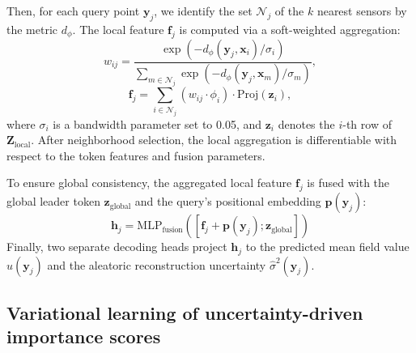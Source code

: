 \documentclass[pdflatex,sn-nature]{sn-jnl}%
\begin{document}
Then, for each query point $\mathbf{y}_j$, we identify the set $\mathcal{N}_j$ of the $k$ nearest sensors by the metric $d_{\phi}$. The local feature $\mathbf{f}_j$ is computed via a soft-weighted aggregation:
\begin{equation}
    w_{ij} = \frac{\exp(-d_{\phi}(\mathbf{y}_j, \mathbf{x}_i) / \sigma_i)}{\sum_{m \in \mathcal{N}_j} \exp(-d_{\phi}(\mathbf{y}_j, \mathbf{x}_m) / \sigma_m)},
\end{equation}
\begin{equation}
    \mathbf{f}_j = \sum_{i \in \mathcal{N}_j} (w_{ij} \cdot \phi_i) \cdot \text{Proj}(\mathbf{z}_i),
\end{equation}
where $\sigma_i$ is a bandwidth parameter set to 0.05, and $\mathbf{z}_i$ denotes the $i$-th row of $\mathbf{Z}_{\text{local}}$. 
After neighborhood selection, the local aggregation is differentiable with respect to the token features and fusion parameters.

To ensure global consistency, the aggregated local feature $\mathbf{f}_j$ is fused with the global leader token $\mathbf{z}_{\text{global}}$ and the query's positional embedding $\mathbf{p}(\mathbf{y}_j)$:
\begin{equation}
    \mathbf{h}_j = \text{MLP}_{\text{fusion}}([\mathbf{f}_j + \mathbf{p}(\mathbf{y}_j); \mathbf{z}_{\text{global}}])
\end{equation}
Finally, two separate decoding heads project $\mathbf{h}_j$ to the predicted mean field value $\hat{u}(\mathbf{y}_j)$ and the aleatoric reconstruction uncertainty $\hat{\sigma}^2(\mathbf{y}_j)$.

\subsection*{Variational learning of uncertainty-driven importance scores}
\label{subsec:ImportanceScore}
\end{document}
